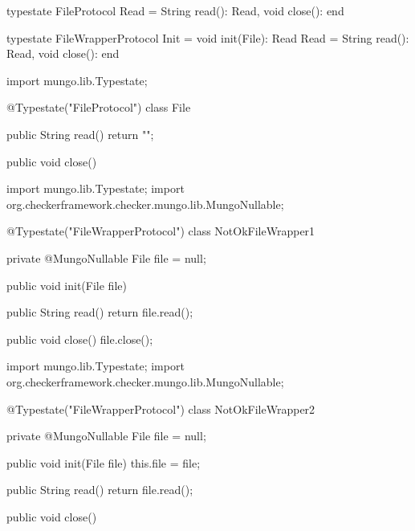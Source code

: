 \begin{code}
typestate FileProtocol {
  Read = {
    String read(): Read,
    void close(): end
  }
}\end{code}

\begin{code}
typestate FileWrapperProtocol {
  Init = {
    void init(File): Read
  }
  Read = {
    String read(): Read,
    void close(): end
  }
}\end{code}

\begin{code}
import mungo.lib.Typestate;

@Typestate("FileProtocol")
class File {

  public String read() {
    return "";
  }

  public void close() {
  }

}\end{code}

\begin{code}
import mungo.lib.Typestate;
import org.checkerframework.checker.mungo.lib.MungoNullable;

@Typestate("FileWrapperProtocol")
class NotOkFileWrapper1 {

  private @MungoNullable File file = null;

  public void init(File file) {}

  public String read() {
    return file.read();
  }

  public void close() {
    file.close();
  }

}\end{code}

\begin{code}
import mungo.lib.Typestate;
import org.checkerframework.checker.mungo.lib.MungoNullable;

@Typestate("FileWrapperProtocol")
class NotOkFileWrapper2 {

  private @MungoNullable File file = null;

  public void init(File file) {
    this.file = file;
  }

  public String read() {
    return file.read();
  }

  public void close() {

  }

}\end{code}

